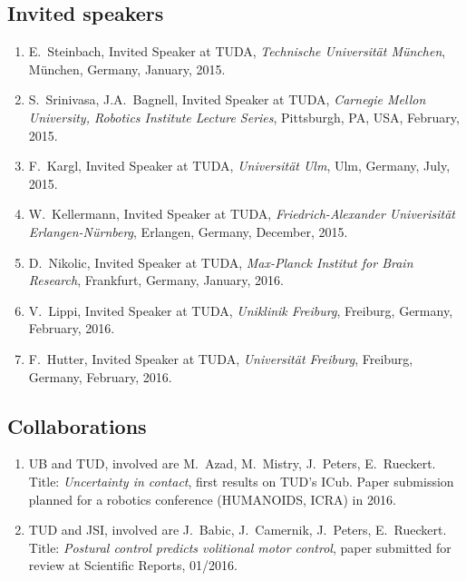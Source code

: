 \subsection{Invited speakers}%
\begin{enumerate}
	\item E.~Steinbach, Invited Speaker at TUDA, \emph{Technische Universit\"at M\"unchen}, M\"unchen, Germany, January, 2015.
	\item S.~Srinivasa, J.A.~Bagnell, Invited Speaker at TUDA, \emph{Carnegie Mellon University, Robotics Institute Lecture Series}, Pittsburgh, PA, USA, February, 2015.
	\item F.~Kargl, Invited Speaker at TUDA, \emph{Universit\"at Ulm}, Ulm, Germany, July, 2015.
	\item W.~Kellermann, Invited Speaker at TUDA, \emph{Friedrich-Alexander Univerisit\"at Erlangen-N\"urnberg}, Erlangen, Germany, December, 2015.
	\item D.~Nikolic, Invited Speaker at TUDA, \emph{Max-Planck Institut for Brain Research}, Frankfurt, Germany, January, 2016.
	\item V.~Lippi, Invited Speaker at TUDA, \emph{Uniklinik Freiburg}, Freiburg, Germany, February, 2016.
	\item F.~Hutter, Invited Speaker at TUDA, \emph{Universit\"at Freiburg}, Freiburg, Germany, February, 2016.
\end{enumerate}

\subsection{Collaborations}

\begin{enumerate}%
	\item UB and TUD, involved are M.~Azad, M.~Mistry, J.~Peters, E.~Rueckert. Title: \emph{Uncertainty in contact}, first results on TUD's ICub. Paper submission planned for a robotics conference (HUMANOIDS, ICRA) in 2016. 
	\item TUD and JSI, involved are J.~Babic, J.~Camernik, J.~Peters, E.~Rueckert. Title: \emph{Postural control predicts volitional motor control}, paper submitted for review at Scientific Reports, 01/2016.
\end{enumerate}

